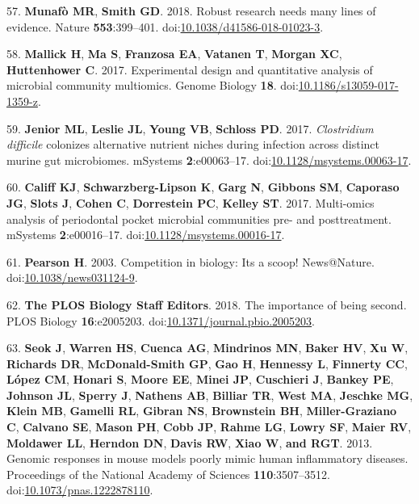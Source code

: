 \documentclass[]{article}
\begin{document}
\hypertarget{ref-Munaf2018}{}
57. \textbf{Munafò MR}, \textbf{Smith GD}. 2018. Robust research needs
many lines of evidence. Nature \textbf{553}:399--401.
doi:\href{https://doi.org/10.1038/d41586-018-01023-3}{10.1038/d41586-018-01023-3}.

\hypertarget{ref-Mallick2017}{}
58. \textbf{Mallick H}, \textbf{Ma S}, \textbf{Franzosa EA},
\textbf{Vatanen T}, \textbf{Morgan XC}, \textbf{Huttenhower C}. 2017.
Experimental design and quantitative analysis of microbial community
multiomics. Genome Biology \textbf{18}.
doi:\href{https://doi.org/10.1186/s13059-017-1359-z}{10.1186/s13059-017-1359-z}.

\hypertarget{ref-Jenior2017}{}
59. \textbf{Jenior ML}, \textbf{Leslie JL}, \textbf{Young VB},
\textbf{Schloss PD}. 2017. \emph{Clostridium difficile} colonizes
alternative nutrient niches during infection across distinct murine gut
microbiomes. mSystems \textbf{2}:e00063--17.
doi:\href{https://doi.org/10.1128/msystems.00063-17}{10.1128/msystems.00063-17}.

\hypertarget{ref-Califf2017}{}
60. \textbf{Califf KJ}, \textbf{Schwarzberg-Lipson K}, \textbf{Garg N},
\textbf{Gibbons SM}, \textbf{Caporaso JG}, \textbf{Slots J},
\textbf{Cohen C}, \textbf{Dorrestein PC}, \textbf{Kelley ST}. 2017.
Multi-omics analysis of periodontal pocket microbial communities pre-
and posttreatment. mSystems \textbf{2}:e00016--17.
doi:\href{https://doi.org/10.1128/msystems.00016-17}{10.1128/msystems.00016-17}.

\hypertarget{ref-Pearson2003}{}
61. \textbf{Pearson H}. 2003. Competition in biology: Its a scoop!
News@Nature.
doi:\href{https://doi.org/10.1038/news031124-9}{10.1038/news031124-9}.

\hypertarget{ref-PB2018}{}
62. \textbf{The PLOS Biology Staff Editors}. 2018. The importance of
being second. PLOS Biology \textbf{16}:e2005203.
doi:\href{https://doi.org/10.1371/journal.pbio.2005203}{10.1371/journal.pbio.2005203}.

\hypertarget{ref-Seok2013}{}
63. \textbf{Seok J}, \textbf{Warren HS}, \textbf{Cuenca AG},
\textbf{Mindrinos MN}, \textbf{Baker HV}, \textbf{Xu W},
\textbf{Richards DR}, \textbf{McDonald-Smith GP}, \textbf{Gao H},
\textbf{Hennessy L}, \textbf{Finnerty CC}, \textbf{López CM},
\textbf{Honari S}, \textbf{Moore EE}, \textbf{Minei JP},
\textbf{Cuschieri J}, \textbf{Bankey PE}, \textbf{Johnson JL},
\textbf{Sperry J}, \textbf{Nathens AB}, \textbf{Billiar TR},
\textbf{West MA}, \textbf{Jeschke MG}, \textbf{Klein MB},
\textbf{Gamelli RL}, \textbf{Gibran NS}, \textbf{Brownstein BH},
\textbf{Miller-Graziano C}, \textbf{Calvano SE}, \textbf{Mason PH},
\textbf{Cobb JP}, \textbf{Rahme LG}, \textbf{Lowry SF}, \textbf{Maier
RV}, \textbf{Moldawer LL}, \textbf{Herndon DN}, \textbf{Davis RW},
\textbf{Xiao W}, \textbf{and RGT}. 2013. Genomic responses in mouse
models poorly mimic human inflammatory diseases. Proceedings of the
National Academy of Sciences \textbf{110}:3507--3512.
doi:\href{https://doi.org/10.1073/pnas.1222878110}{10.1073/pnas.1222878110}.
\end{document}
